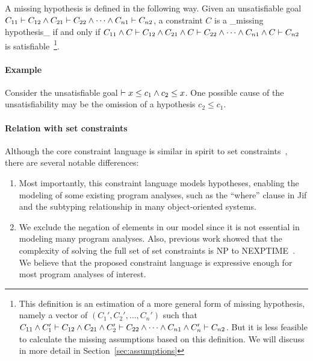 A missing hypothesis is defined in the following way.
Given an unsatisfiable goal $C_{11} \vdash C_{12} \land C_{21} \vdash C_{22}
\land \dots \land C_{n1} \vdash C_{n2}$, a constraint $C$ is a _missing
hypothesis_ if and only if $C_{11} \land C \vdash C_{12} \land C_{21} \land C
\vdash C_{22} \land \dots \land C_{n1} \land C \vdash C_{n2}$ is
satisfiable~\footnote{This definition is an estimation of a more general form
of missing hypothesis, namely a vector of $(C_1', C_2', \dots, C_n')$ such that
$C_{11} \land C_1' \vdash C_{12} \land C_{21} \land C_2' \vdash C_{22} \land
\dots \land C_{n1} \land C_n' \vdash C_{n2}$. But it is less feasible to
calculate the missing assumptions based on this definition. We will discuss in
more detail in Section~\ref{sec:assumptions}}.

\paragraph{Example}
Consider the unsatisfiable goal $\vdash x \leq c_1 \land c_2 \leq x$.
One possible cause of the unsatisfiability may be the omission of a
hypothesis $c_2\leq c_1$.

\paragraph{Relation with set constraints}

Although the core constraint language is similar in spirit to set
constraints~\cite{aiken-setconstraint}, there are several notable
differences:

\begin{enumerate}

\item Most importantly, this constraint language models hypotheses,
enabling the modeling of some existing program analyses, such as the
``where'' clause in Jif and the subtyping relationship in many
object-oriented systems. 

\item We exclude the negation of elements in our model since it is not
essential in modeling many program analyses. Also, previous work
showed that the complexity of solving the full set of set constraints
is NP to NEXPTIME~\cite{aiken-complexity}. We believe that the
proposed constraint language is expressive enough for most program
analyses of interest.

\end{enumerate}

